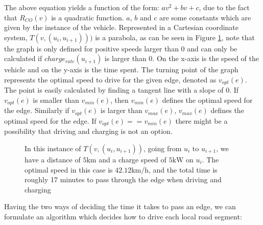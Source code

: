 The above equation yields a function of the form: $av^2 + bv + c$, due to the fact that $R_{CO}(v)$ is a quadratic function. $a$, $b$ and $c$ are some constants which are given by the instance of the vehicle. Represented in a Cartesian coordinate system, $T(v,(u_i, u_{i+1})))$ is a parabola, as can be seen in Figure \ref{fig:graph}, note that the graph is only defined for positive speeds larger than $0$ and can only be calculated if $charge_{rate}(u_{i+1})$ is larger than $0$. On the x-axis is the speed of the vehicle and on the y-axis is the time spent. The turning point of the graph represents the optimal speed to drive for the given edge, denoted as $v_{opt}(e)$. The point is easily calculated by finding a tangent line with a slope of $0$. If $v_{opt}(e)$ is smaller than $v_{min}(e)$, then $v_{min}(e)$ defines the optimal speed for the edge. Similarly if $v_{opt}(e)$ is larger than $v_{max}(e)$, $v_{max}(e)$ defines the optimal speed for the edge. If $v_{opt}(e) == v_{min}(e)$ there might be a possibility that driving and charging is not an option. 

\begin{figure}[!htb]
\label{fig:graph}
% 
\caption{In this instance of $T(v,(u_i, u_{i+1}))$, going from $u_i$ to $u_{i+1}$, we have a distance of $5 \si{\km}$ and a charge speed of $5 \si{\kW}$ on $u_i$. The optimal speed in this case is $42.12\si{\km\per\hour}$, and the total time is roughly 17 minutes to pass through the edge when driving and charging}
\end{figure}
Having the two ways of deciding the time it takes to pass an edge, we can formulate an algorithm which decides how to drive each local road segment:

